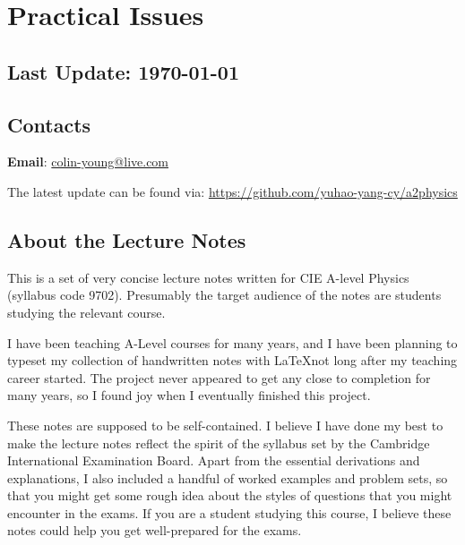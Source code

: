 \section*{Practical Issues}

\subsection*{Last Update: \today}

\subsection*{Contacts}
\textbf{Email}: \url{colin-young@live.com}

The latest update can be found via: \url{https://github.com/yuhao-yang-cy/a2physics}

%



\subsection*{About the Lecture Notes}

This is a set of very concise lecture notes written for CIE A-level Physics (syllabus code 9702). Presumably the target audience of the notes are students studying the relevant course.

I have been teaching A-Level courses for many years, and I have been planning to typeset my collection of handwritten notes with \LaTeX \phantom{ }not long after my teaching career started. The project never appeared to get any close to completion for many years, so I found joy when I eventually finished this project. 

These notes are supposed to be self-contained. I believe I have done my best to make the lecture notes reflect the spirit of the syllabus set by the Cambridge International Examination Board. Apart from the essential derivations and explanations, I also included a handful of worked examples and problem sets, so that you might get some rough idea about the styles of questions that you might encounter in the exams. If you are a student studying this course, I believe these notes could help you get well-prepared for the exams.

